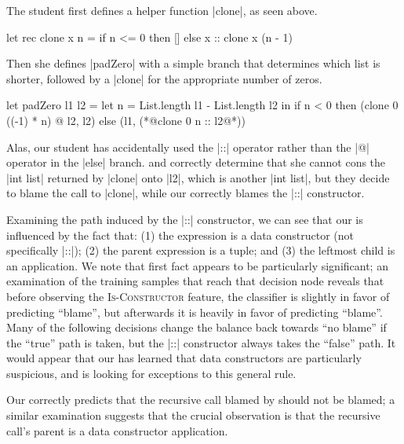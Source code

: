 The student first defines a helper function |clone|, as seen above.
%
\begin{ecode}
  let rec clone x n =
    if n <= 0 then
      []
    else
      x :: clone x (n - 1)
\end{ecode}
%
Then she defines |padZero| with a simple branch that determines which
list is shorter, followed by a |clone| for the appropriate number of
zeros.
%
\lstset{firstnumber=last}
\begin{ecode}
  let padZero l1 l2 =
    let n = List.length l1 - List.length l2 in
    if n < 0 then
      (clone 0 ((-1) * n) @ l2, l2)
    else
      (l1, (*@\colorbox{tree!75}{\colorbox{sherrloc!75}{clone 0 n} :: l2}@*))
\end{ecode}
\lstset{firstnumber=1}
%
Alas, our student has accidentally used the |::| operator rather than
the |@| operator in the |else| branch.
%
\sherrloc and \ocaml correctly determine that she cannot cons the
|int list| returned by |clone| onto |l2|, which is another |int list|,
but they decide to blame the call to |clone|, while our
\dectree correctly blames the |::| constructor.

Examining the path induced by the |::| constructor, we can see that our
\dectree is influenced by the fact that:
%
(1) the expression is a data constructor (not specifically |::|);
%
(2) the parent expression is a tuple; and
%
(3) the leftmost child is an application.
%
We note that first fact appears to be particularly significant; an
examination of the training samples that reach that decision node
reveals that before observing the \textsc{Is-Constructor} feature, the
classifier is slightly in favor of predicting ``blame'', but afterwards
it is heavily in favor of predicting ``blame''.
%
Many of the following decisions change the balance back towards ``no
blame'' if the ``true'' path is taken, but the |::| constructor always
takes the ``false'' path.
%
It would appear that our \dectree has learned that data constructors are
particularly suspicious, and is looking for exceptions to this general
rule.
%

Our \dectree correctly predicts that the recursive call blamed by
\sherrloc should not be blamed; a similar examination suggests that the
crucial observation is that the recursive call's parent is a data
constructor application.
%




